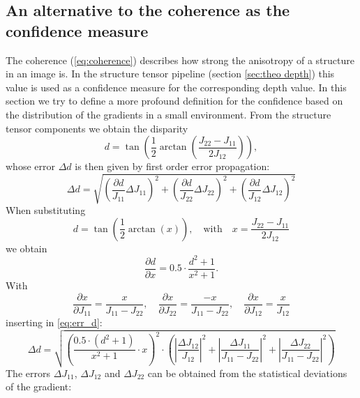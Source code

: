 \documentclass  [
  paper    = a4,
  BCOR     = 10mm,
  twoside,
  fontsize = 12pt,
  fleqn,
  toc      = bibnumbered,
  toc      = listofnumbered,
  numbers  = noendperiod,
  headings = normal,
  listof   = leveldown,
  version  = 3.03
]                                       {scrreprt}
\begin{document}
 \subsection{An alternative to the coherence as the confidence measure}
 \label{sec:alternative}
 The coherence (\ref{eq:coherence}) describes how strong the anisotropy of a structure in an image is. In the structure tensor pipeline (section \ref{sec:theo depth}) this value is used as a confidence measure for the corresponding depth value. In this section we try to define a more profound definition for the confidence based on the distribution of the gradients in a small environment.
 From the structure tensor components we obtain the disparity 
 \begin{equation}\label{eq:disparity2}
 d = \tan\left(\frac{1}{2} \arctan\left( \frac{J_{22}-J_{11}}{2J_{12}}\right)\right),
 \end{equation}
 whose error $\Delta d$ is then given by first order error propagation:
 \begin{equation}\label{eq:err_d}
 \Delta d = \sqrt{\left(\frac{\partial d}{J_{11}}  \Delta J_{11}\right)^2 + \left(\frac{\partial d}{J_{22}}  \Delta J_{22}\right)^2 + \left(\frac{\partial d}{J_{12}} \Delta J_{12}\right)^2 }
 \end{equation}
 When substituting
 \begin{equation}\label{eq:disparity2}
 d = \tan\left(\frac{1}{2} \arctan\left( x\right)\right),\quad \text{with}\quad  x = \frac{J_{22}-J_{11}}{2J_{12}}
 \end{equation}
 we obtain
 \begin{equation}\label{key}
 \frac{\partial d}{\partial x} = 0.5\cdot \frac{d^2+1}{x^2+1}.
 \end{equation}
 With
 \begin{equation}\label{key}
 \frac{\partial x}{\partial J_{11}} = \frac{x}{J_{11} - J_{22}},\quad \frac{\partial x}{\partial J_{22}} = \frac{-x}{J_{11} - J_{22}},\quad  \frac{\partial x}{\partial J_{12}} = \frac{x}{J_{12}}
 \end{equation}
 inserting in \ref{eq:err_d}:
 \begin{equation}\label{eq:deviation_d}
 \Delta d =\sqrt{\left(\frac{0.5\cdot(d^2+1)}{x^2+1}\cdot x\right)^2 \cdot \left(\left|\frac{\Delta J_{12}}{J_{12}}\right|^2 + \left|\frac{\Delta J_{11}}{J_{11}-J_{22}}\right|^2 + \left|\frac{\Delta J_{22}}{J_{11}-J_{22}}\right|^2\right)}
 \end{equation}
 The errors $\Delta J_{11}$, $\Delta J_{12}$ and $\Delta J_{22}$ can be obtained from the statistical deviations of the gradient:
\end{document}
